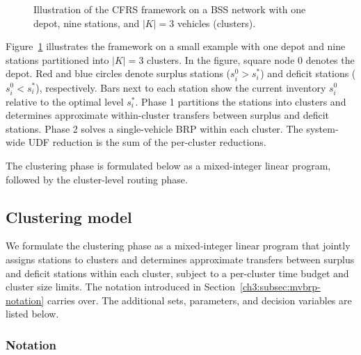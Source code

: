 \begin{figure}[htbp]
\centering
{}
\caption{Illustration of the CFRS framework on a BSS network with one depot, nine stations, and $\left| K \right|=3$ vehicles (clusters).}
\label{ch3:fig:cfrs-framework}
\end{figure}

Figure~\ref{ch3:fig:cfrs-framework} illustrates the framework on a small example with one depot and nine stations partitioned into $\left| K \right|=3$ clusters. In the figure, square node 0 denotes the depot. Red and blue circles denote surplus stations ($s_{i}^{0}>s_{i}^{*}$) and deficit stations ($s_{i}^{0}<s_{i}^{*}$), respectively. Bars next to each station show the current inventory $s_{i}^{0}$ relative to the optimal level $s_{i}^{*}$. Phase 1 partitions the stations into clusters and determines approximate within-cluster transfers between surplus and deficit stations. Phase 2 solves a single-vehicle BRP within each cluster. The system-wide UDF reduction is the sum of the per-cluster reductions.

The clustering phase is formulated below as a mixed-integer linear program, followed by the cluster-level routing phase.

\subsection{Clustering model}\label{ch3:subsec:clustering-model}

We formulate the clustering phase as a mixed-integer linear program that jointly assigns stations to clusters and determines approximate transfers between surplus and deficit stations within each cluster, subject to a per-cluster time budget and cluster size limits. The notation introduced in Section~\ref{ch3:subsec:mvbrp-notation} carries over. The additional sets, parameters, and decision variables are listed below.

\subsubsection{Notation}\label{ch3:subsubsec:clustering-notation}

